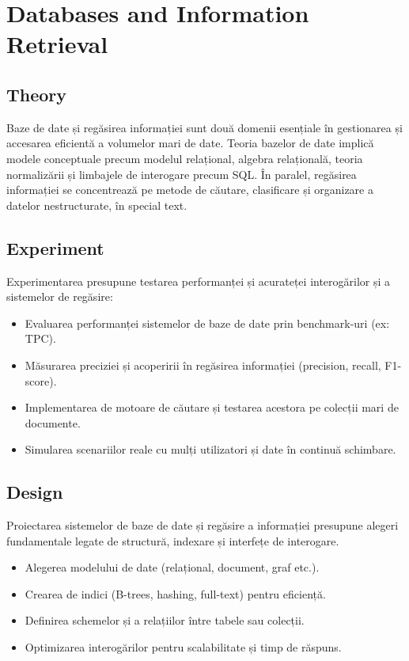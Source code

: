 \documentclass[12pt, letterpaper]{article}
\begin{document}
\newpage
\section{Databases and Information Retrieval}

\subsection*{Theory}
Baze de date și regăsirea informației sunt două domenii esențiale în gestionarea și accesarea eficientă a volumelor mari de date. Teoria bazelor de date implică modele conceptuale precum modelul relațional, algebra relațională, teoria normalizării și limbajele de interogare precum SQL. În paralel, regăsirea informației se concentrează pe metode de căutare, clasificare și organizare a datelor nestructurate, în special text.

\subsection*{Experiment}
Experimentarea presupune testarea performanței și acurateței interogărilor și a sistemelor de regăsire:
\begin{itemize}
    \item Evaluarea performanței sistemelor de baze de date prin benchmark-uri (ex: TPC).
    \item Măsurarea preciziei și acoperirii în regăsirea informației (precision, recall, F1-score).
    \item Implementarea de motoare de căutare și testarea acestora pe colecții mari de documente.
    \item Simularea scenariilor reale cu mulți utilizatori și date în continuă schimbare.
\end{itemize}

\subsection*{Design}
Proiectarea sistemelor de baze de date și regăsire a informației presupune alegeri fundamentale legate de structură, indexare și interfețe de interogare.
\begin{itemize}
    \item Alegerea modelului de date (relațional, document, graf etc.).
    \item Crearea de indici (B-trees, hashing, full-text) pentru eficiență.
    \item Definirea schemelor și a relațiilor între tabele sau colecții.
    \item Optimizarea interogărilor pentru scalabilitate și timp de răspuns.
\end{itemize}
\end{document}
